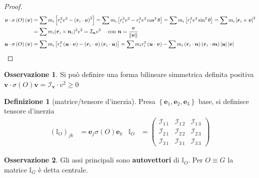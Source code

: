 \documentclass[a4paper,10pt]{article}
\theoremstyle{definition}
\newcommand{\bv}{\boldsymbol} %
\theoremstyle{indentdefinition}
\newtheorem{defn}{Definizione}[section]
\theoremstyle{indenttheorem}
\theoremstyle{myremark}
\newtheorem*{rem*}{Osservazione}
\theoremstyle{indentgeneral}
\begin{document}
\begin{proof}
\begin{align*}
\boldsymbol{v}\cdot\sigma\left(O\right)\left(\boldsymbol{v}\right) & =\sum m_{i}\left[r_{i}^{2}v^{2}-\left(\boldsymbol{r}_{i}\cdot\boldsymbol{v}\right)^{2}\right]=\sum m_{i}\left[r_{i}^{2}v^{2}-r_{i}^{2}v^{2}\cos^{2}\theta\right]=\sum m_{i}\left[r_{i}^{2}v^{2}\sin^{2}\theta\right]=\sum m_{i}\left[\boldsymbol{r}_{i}\times\boldsymbol{v}\right]^{2}\\
&=\sum m_i(\bv{r}_i\times \bv{n}_i)^2v^2=\mathcal{I}_{\bv{n}}v^2 \quad \text{ con }\bv{n}=\frac{\bv{v}}{\norm{\bv{v}}} \\
\boldsymbol{u}\cdot\sigma\left(O\right)\left(\boldsymbol{v}\right) & =\sum m_{i}\left[r_{i}^{2}\left(\boldsymbol{u}\cdot\boldsymbol{v}\right)-\left(\boldsymbol{r}_{i}\cdot\boldsymbol{v}\right)\left(\boldsymbol{r}_{i}\cdot\boldsymbol{u}\right)\right]=\sum m_{i}r_{i}^{2}\left(\boldsymbol{u}\cdot\boldsymbol{v}\right)-\sum m_{i}\left(\boldsymbol{r}_{i}\cdot\boldsymbol{n}\right)\left(\boldsymbol{r}_{i}\cdot\boldsymbol{m}\right)\left|\boldsymbol{u}\right|\left|\boldsymbol{v}\right|
\end{align*}
\end{proof}
\begin{rem*}
Si può definire una forma bilineare simmetrica definita positiva $\boldsymbol{v}\cdot\sigma\left(O\right)\boldsymbol{v}=\mathcal{I}_{\boldsymbol{v}}\cdot v^{2}\geq0$
\end{rem*}
\begin{defn}[matrice/tensore d'inerzia]
Presa $\left\{ \boldsymbol{e}_{1},\boldsymbol{e}_{2},\boldsymbol{e}_{3}\right\} $
base, si definisce tensore d'inerzia
\begin{align*}
\left(\mathbb{I}_{O}\right)_{jk} & =\boldsymbol{e}_{j}\sigma\left(O\right)\boldsymbol{e}_{k} & \mathbb{I}_{O} & =\begin{pmatrix}\mathcal{I}_{1\,1} & \mathcal{I}_{1\,2} & \mathcal{I}_{1\,3}\\
\mathcal{I}_{2\,1} & \mathcal{I}_{2\,2} & \mathcal{I}_{2\,3}\\
\mathcal{I}_{3\,1} & \mathcal{I}_{3\,1} & \mathcal{I}_{3\,3}
\end{pmatrix}
\end{align*}
\end{defn}

\begin{rem*}
Gli assi principali sono \textbf{autovettori} di $\mathbb{I}_{O}$. Per $O\equiv G$
la matrice $\mathbb{I}_{G}$ è detta centrale.
\end{rem*}
\end{document}

